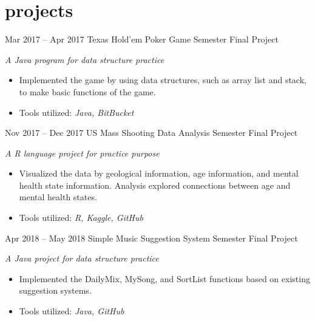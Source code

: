 \documentclass[]{friggeri-cv}
\begin{document}
\section{projects}
\begin{entrylist}
  \entry
    {Mar 2017 -- Apr 2017}
    {Texas Hold’em Poker Game}
    {Semester Final Project}
    {\emph{A Java program for data structure practice}
    \begin{itemize}[leftmargin=1.2em]
    \item Implemented the game by using data structures, such as array list and stack, to make basic functions of the game.
    \item Tools utilized: \emph{Java, BitBucket}
    \end{itemize}}
  \entry
    {Nov 2017 -- Dec 2017}
    {US Mass Shooting Data Analysis}
    {Semester Final Project}
    {\emph{A R language project for practice purpose}
    \begin{itemize}[leftmargin=1.2em]
    \item Visualized the data by geological information, age information, and mental health state information. Analysis explored connections between age and mental health states.
    \item Tools utilized: \emph{R, Kaggle, GitHub}
    \end{itemize}}
  \entry
    {Apr 2018 -- May 2018}
    {Simple Music Suggestion System}
    {Semester Final Project}
    {\emph{A Java project for data structure practice}
    \begin{itemize}[leftmargin=1.2em]
    \item Implemented the DailyMix, MySong, and SortList functions based on existing suggestion systems.
    \item Tools utilized: \emph{Java, GitHub}
    \end{itemize}}
\end{entrylist}
\end{document}
